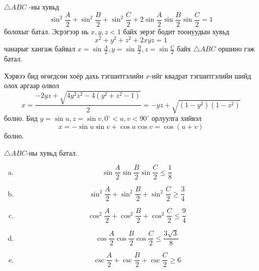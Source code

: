 \documentclass[10pt,a4paper,oneside]{book}
\begin{document}
\Problem
$\triangle ABC$ -ны хувьд
\begin{equation*}
\sin^2 \frac{A}{2} + \sin^2 \frac{B}{2} + \sin^2 \frac{C}{2} + 2\sin \frac{A}{2}\sin \frac{B}{2} \sin \frac{C}{2} = 1
\end{equation*}
болохыг батал. Эсрэгээр нь $x, y, z < 1$ байх эерэг бодит тоонуудын хувьд 
\begin{equation*}
x^2+y^2+z^2+2xyz = 1
\end{equation*}
чанарыг хангаж байвал $x=\sin \frac{A}{2}, y = \sin \frac{B}{2}, z= \sin\frac{C}{2}$  байх $\triangle ABC$ оршино гэж батал.

\TheSolution
Хэрвээ бид өгөгдсөн хоёр дахь тэгшитгэлийн $x$-ийг квадрат тэгшитгэлийн шийд олох аргаар олвол
\begin{equation*}
x=\frac{-2yz + \sqrt{4y^2z^2-4(y^2+z^2-1)}}{2} = -yz + \sqrt{(1-y^2)(1-z^2)}
\end{equation*}
болно. Бид $y=\sin u, z=\sin v, 0^\circ < u, v < 90^\circ$ орлуулга хийвэл
\begin{equation*}
x=-\sin u \sin v + \cos u\cos v = \cos(u+v)
\end{equation*}
болно.

\Problem
$\triangle ABC$-ны хувьд батал.
\begin{enumerate}[(a)]
\item
\begin{equation*}
\sin \frac{A}{2}\sin \frac{B}{2}\sin \frac{C}{2} \leq \frac{1}{8}
\end{equation*}
\item
\begin{equation*}
\sin^2 \frac{A}{2} + \sin^2 \frac{B}{2} + \sin^2 \frac{C}{2} \geq \frac{3}{4}
\end{equation*}
\item
\begin{equation*}
\cos^2 \frac{A}{2}+\cos^2 \frac{B}{2}+\cos^2 \frac{C}{2} \leq \frac{9}{4}
\end{equation*}
\item
\begin{equation*}
\cos \frac{A}{2}\cos \frac{B}{2} \cos \frac{C}{2} \leq \frac{3\sqrt{3}}{8}
\end{equation*}
\item
\begin{equation*}
\csc \frac{A}{2} + \csc \frac{B}{2} + \csc \frac{C}{2} \geq 6
\end{equation*}
\end{enumerate}
\end{document}
